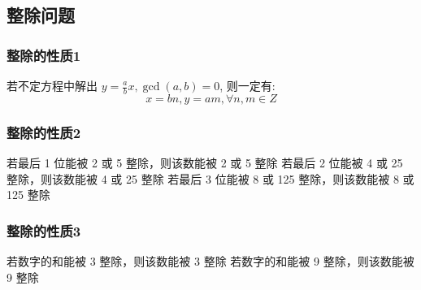 \subsection{整除问题}

\subsubsection{整除的性质1}

若不定方程中解出 $y = \frac{a}{b}x, \gcd (a, b) = 0$, 则一定有:
\[
	x = bn, y = am, \forall n, m \in Z
\]

\subsubsection{整除的性质2}

若最后 1 位能被 2 或 5 整除，则该数能被 2 或 5 整除
若最后 2 位能被 4 或 25 整除，则该数能被 4 或 25 整除
若最后 3 位能被 8 或 125 整除，则该数能被 8 或 125 整除

\subsubsection{整除的性质3}

若数字的和能被 3 整除，则该数能被 3 整除
若数字的和能被 9 整除，则该数能被 9 整除
